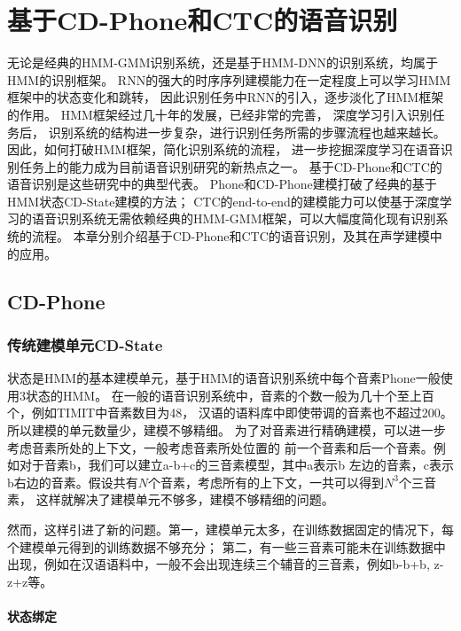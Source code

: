 ﻿%

\chapter{基于CD-Phone和CTC的语音识别}

无论是经典的HMM-GMM识别系统，还是基于HMM-DNN的识别系统，均属于HMM的识别框架。
RNN的强大的时序序列建模能力在一定程度上可以学习HMM框架中的状态变化和跳转，
因此识别任务中RNN的引入，逐步淡化了HMM框架的作用。
HMM框架经过几十年的发展，已经非常的完善，
深度学习引入识别任务后，
识别系统的结构进一步复杂，进行识别任务所需的步骤流程也越来越长。
因此，如何打破HMM框架，简化识别系统的流程，
进一步挖掘深度学习在语音识别任务上的能力成为目前语音识别研究的新热点之一。
基于CD-Phone和CTC的语音识别是这些研究中的典型代表。
Phone和CD-Phone建模打破了经典的基于HMM状态CD-State建模的方法；
CTC的end-to-end的建模能力可以使基于深度学习的语音识别系统无需依赖经典的HMM-GMM框架，可以大幅度简化现有识别系统的流程。
本章分别介绍基于CD-Phone和CTC的语音识别，及其在声学建模中的应用。

\section{CD-Phone}

\subsection{传统建模单元CD-State} \label{seg:cdstate}

状态是HMM的基本建模单元，基于HMM的语音识别系统中每个音素Phone一般使用3状态的HMM。
在一般的语音识别系统中，音素的个数一般为几十个至上百个，例如TIMIT中音素数目为48，
汉语的语料库中即使带调的音素也不超过200。所以建模的单元数量少，建模不够精细。
为了对音素进行精确建模，可以进一步考虑音素所处的上下文，一般考虑音素所处位置的
前一个音素和后一个音素。例如对于音素b，我们可以建立a-b+c的三音素模型，其中a表示b
左边的音素，c表示b右边的音素。假设共有$N$个音素，考虑所有的上下文，一共可以得到$N^3$个三音素，
这样就解决了建模单元不够多，建模不够精细的问题。

然而，这样引进了新的问题。第一，建模单元太多，在训练数据固定的情况下，每个建模单元得到的训练数据不够充分；
第二，有一些三音素可能未在训练数据中出现，例如在汉语语料中，一般不会出现连续三个辅音的三音素，例如b-b+b,
z-z+z等。

\subsubsection{状态绑定}

